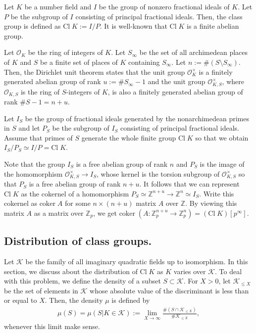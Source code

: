 \documentclass[12pt,reqno]{amsart}
\numberwithin{equation}{section}
\def\Z{{\mathbb Z}}
\def\sK{{\mathscr K}}
\def\sO{{\mathcal O}}
\begin{document}
Let $K$ be a number field and $I$ be the group of nonzero fractional ideals of $K$. Let $P$ be the subgroup of $I$ consisting of principal fractional ideals. Then, the class group is defined as $\text{Cl} \; K:=I/P$. It is well-known that $\text{Cl}\; K$ is a finite abelian group. 

Let $\sO_K$ be the ring of integers of $K$. Let $S_\infty$ be the set of all archimedean places of $K$ and $S$ be a finite set of places of $K$ containing $S_\infty$. Let $n:= \#(S \setminus S_\infty)$. Then, the Dirichlet unit theorem states that the unit group $\sO_K^\times$ is a finitely generated abelian group of rank $u:= \# S_\infty -1$ and the unit group $\sO_{K,S}^\times$, where $\sO_{K,S}$ is the ring of $S$-integers of $K$, is also a finitely generated abelian group of rank $\#S - 1 = n + u$. 

Let $I_S$ be the group of fractional ideals generated by the nonarchimedean primes in $S$ and let $P_S$ be the subgroup of $I_S$ consisting of principal fractional ideals. Assume that primes of $S$ generate the whole finite group $\text{Cl}\; K$ so that we obtain $I_S/P_S \simeq I/P = \text{Cl} \; K$.

Note that the group $I_S$ is a free abelian group of rank $n$ and $P_S$ is the image of the homomorphism $\sO_{K,S}^\times \to I_S$, whose kernel is the torsion subgroup of $\sO_{K,S}^\times$ so that $P_S$ is a free abelian group of rank $n+u$. It follows that we can represent $\text{Cl} \; K$ as the cokernel of a homomorphism $P_S \simeq \Z^{n+u} \to \Z^n \simeq I_S$. Write this cokernel as $\text{coker} \; A$ for some $n \times (n+u)$ matrix $A$ over $\Z$. By viewing this matrix $A$ as a matrix over $\Z_p$, we get $\text{coker} \; (A: \Z_p^{n+u} \to \Z_p^n) = (\text{Cl} \; K) [p^\infty]$.


\subsection{Distribution of class groups.}

Let $\sK$ be the family of all imaginary quadratic fields up to isomorphism. In this section, we discuss about the distribution of $\text{Cl} \; K$ as $K$ varies over $\sK$. To deal with this problem, we define the density of a subset $S \subset \sK$. For $X>0$, let $\sK_{\le X}$ be the set of elements in $\sK$ whose absolute value of the discriminant is less than or equal to $X$. Then, the density $\mu$ is defined by
\begin{align*}
\mu(S) = \mu(S | K \in \sK) := \lim_{X \to \infty} \frac{\#(S \cap \sK_{\le X})}{\# \sK_{\le X}},
\end{align*}
whenever this limit make sense.
\end{document}
